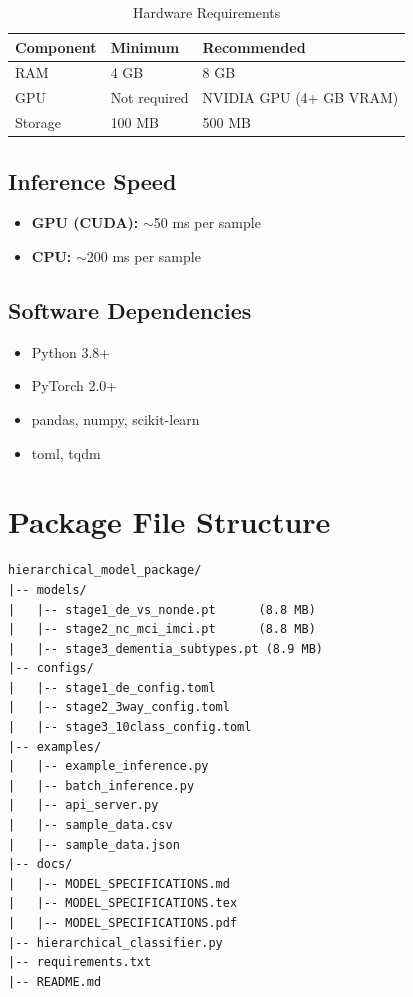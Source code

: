 \documentclass[11pt,a4paper]{article}
\begin{document}
\begin{table}[H]
\centering
\caption{Hardware Requirements}
\label{tab:hardware}
\begin{tabular}{@{}lll@{}}
\toprule
\textbf{Component} & \textbf{Minimum} & \textbf{Recommended} \\
\midrule
RAM & 4 GB & 8 GB \\
GPU & Not required & NVIDIA GPU (4+ GB VRAM) \\
Storage & 100 MB & 500 MB \\
\bottomrule
\end{tabular}
\end{table}

\subsection{Inference Speed}

\begin{itemize}
    \item \textbf{GPU (CUDA):} $\sim$50 ms per sample
    \item \textbf{CPU:} $\sim$200 ms per sample
\end{itemize}

\subsection{Software Dependencies}

\begin{itemize}
    \item Python 3.8+
    \item PyTorch 2.0+
    \item pandas, numpy, scikit-learn
    \item toml, tqdm
\end{itemize}

\section{Package File Structure}

\begin{lstlisting}[caption=Package Directory Structure]
hierarchical_model_package/
|-- models/
|   |-- stage1_de_vs_nonde.pt      (8.8 MB)
|   |-- stage2_nc_mci_imci.pt      (8.8 MB)
|   |-- stage3_dementia_subtypes.pt (8.9 MB)
|-- configs/
|   |-- stage1_de_config.toml
|   |-- stage2_3way_config.toml
|   |-- stage3_10class_config.toml
|-- examples/
|   |-- example_inference.py
|   |-- batch_inference.py
|   |-- api_server.py
|   |-- sample_data.csv
|   |-- sample_data.json
|-- docs/
|   |-- MODEL_SPECIFICATIONS.md
|   |-- MODEL_SPECIFICATIONS.tex
|   |-- MODEL_SPECIFICATIONS.pdf
|-- hierarchical_classifier.py
|-- requirements.txt
|-- README.md
\end{lstlisting}
\end{document}
